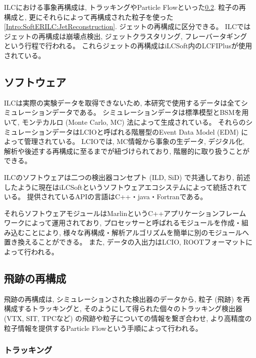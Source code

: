 ILCにおける事象再構成は, トラッキングやParticle Flowといった\ref{Intro:SoftERILC:ParticleReconstruction}. 粒子の再構成と, 更にそれらによって再構成された粒子を使った\ref{Intro:SoftERILC:JetReconstruction}. ジェットの再構成に区分できる。
ILCではジェットの再構成は崩壊点検出, ジェットクラスタリング, フレーバータギングという行程で行われる。
これらジェットの再構成はiLCSoft内のLCFIPlus\cite{LCFIPlus}が使用されている。


\subsection{ソフトウェア} \label{Intro:SoftERILC:Software}

ILCは実際の実験データを取得できないため, 本研究で使用するデータは全てシミュレーションデータである。
シミュレーションデータは標準模型とBSMを用いて, モンテカルロ (Monte Carlo, MC) 法によって生成されている。
それらのシミュレーションデータはLCIOと呼ばれる階層型のEvent Data Model (EDM) によって管理されている。
LCIOでは, MC情報から事象の生データ, デジタル化, 解析や後述する再構成に至るまでが紐づけられており, 階層的に取り扱うことができる。

ILCのソフトウェアは二つの検出器コンセプト (ILD, SiD) で共通しており, 前述したように現在はiLCSoftというソフトウェアエコシステムによって統括されている。
提供されているAPIの言語はC++・java・Fortranである。

それらソフトウェアモジュールはMarlin\cite{Marlinpaper}というC++アプリケーションフレームワークによって運用されており, プロセッサーと呼ばれるモジュールを作成・組み込むことにより, 様々な再構成・解析アルゴリズムを簡単に別のモジュールへ置き換えることができる。
また, データの入出力はLCIO, ROOTフォーマットによって行われる。


\subsection{飛跡の再構成} \label{Intro:SoftERILC:ParticleReconstruction}

飛跡の再構成は, シミュレーションされた検出器のデータから, 粒子 (飛跡) を再構成するトラッキングと, そのようにして得られた個々のトラッキング検出器 (VTX, SIT, TPCなど) の飛跡や粒子についての情報を繋ぎ合わせ, より高精度の粒子情報を提供するParticle Flowという手順によって行われる。

\subsubsection{トラッキング}

